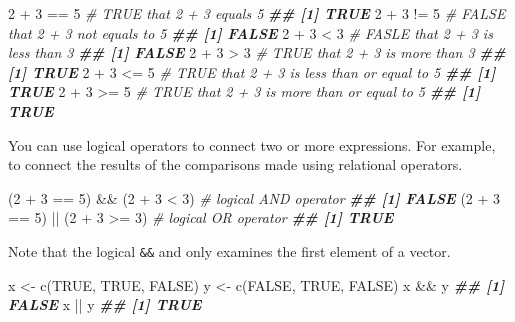 \documentclass[
]{book}
\newenvironment{Shaded}{\begin{snugshade}}{\end{snugshade}}
\newcommand{\CommentTok}[1]{\textcolor[rgb]{0.56,0.35,0.01}{\textit{#1}}}
\newcommand{\ConstantTok}[1]{\textcolor[rgb]{0.00,0.00,0.00}{#1}}
\newcommand{\DecValTok}[1]{\textcolor[rgb]{0.00,0.00,0.81}{#1}}
\newcommand{\DocumentationTok}[1]{\textcolor[rgb]{0.56,0.35,0.01}{\textbf{\textit{#1}}}}
\newcommand{\FunctionTok}[1]{\textcolor[rgb]{0.00,0.00,0.00}{#1}}
\newcommand{\NormalTok}[1]{#1}
\newcommand{\OtherTok}[1]{\textcolor[rgb]{0.56,0.35,0.01}{#1}}
\newcommand{\SpecialCharTok}[1]{\textcolor[rgb]{0.00,0.00,0.00}{#1}}
\begin{document}
\begin{Shaded}
\begin{Highlighting}[]
\DecValTok{2} \SpecialCharTok{+} \DecValTok{3} \SpecialCharTok{==} \DecValTok{5} \CommentTok{\# TRUE that 2 + 3 equals 5}
\DocumentationTok{\#\# [1] TRUE}
\DecValTok{2} \SpecialCharTok{+} \DecValTok{3} \SpecialCharTok{!=} \DecValTok{5} \CommentTok{\# FALSE that 2 + 3 not equals to 5}
\DocumentationTok{\#\# [1] FALSE}
\DecValTok{2} \SpecialCharTok{+} \DecValTok{3} \SpecialCharTok{\textless{}} \DecValTok{3} \CommentTok{\# FASLE that 2 + 3 is less than 3}
\DocumentationTok{\#\# [1] FALSE}
\DecValTok{2} \SpecialCharTok{+} \DecValTok{3} \SpecialCharTok{\textgreater{}} \DecValTok{3} \CommentTok{\# TRUE that 2 + 3 is more than 3}
\DocumentationTok{\#\# [1] TRUE}
\DecValTok{2} \SpecialCharTok{+} \DecValTok{3} \SpecialCharTok{\textless{}=} \DecValTok{5} \CommentTok{\# TRUE that 2 + 3 is less than or equal to 5}
\DocumentationTok{\#\# [1] TRUE}
\DecValTok{2} \SpecialCharTok{+} \DecValTok{3} \SpecialCharTok{\textgreater{}=} \DecValTok{5} \CommentTok{\# TRUE that 2 + 3 is more than or equal to 5}
\DocumentationTok{\#\# [1] TRUE}
\end{Highlighting}
\end{Shaded}

You can use logical operators to connect two or more expressions. For example, to connect the results of the comparisons made using relational operators.

\begin{Shaded}
\begin{Highlighting}[]
\NormalTok{(}\DecValTok{2} \SpecialCharTok{+} \DecValTok{3} \SpecialCharTok{==} \DecValTok{5}\NormalTok{) }\SpecialCharTok{\&\&}\NormalTok{ (}\DecValTok{2} \SpecialCharTok{+} \DecValTok{3} \SpecialCharTok{\textless{}} \DecValTok{3}\NormalTok{) }\CommentTok{\# logical AND operator}
\DocumentationTok{\#\# [1] FALSE}
\NormalTok{(}\DecValTok{2} \SpecialCharTok{+} \DecValTok{3} \SpecialCharTok{==} \DecValTok{5}\NormalTok{) }\SpecialCharTok{||}\NormalTok{ (}\DecValTok{2} \SpecialCharTok{+} \DecValTok{3} \SpecialCharTok{\textgreater{}=} \DecValTok{3}\NormalTok{) }\CommentTok{\# logical OR operator}
\DocumentationTok{\#\# [1] TRUE}
\end{Highlighting}
\end{Shaded}

Note that the logical \texttt{\&\&} and \texttt{\textbar{}\textbar{}} only examines the first element of a vector.

\begin{Shaded}
\begin{Highlighting}[]
\NormalTok{x }\OtherTok{\textless{}{-}} \FunctionTok{c}\NormalTok{(}\ConstantTok{TRUE}\NormalTok{, }\ConstantTok{TRUE}\NormalTok{, }\ConstantTok{FALSE}\NormalTok{)}
\NormalTok{y }\OtherTok{\textless{}{-}} \FunctionTok{c}\NormalTok{(}\ConstantTok{FALSE}\NormalTok{, }\ConstantTok{TRUE}\NormalTok{, }\ConstantTok{FALSE}\NormalTok{)}
\NormalTok{x }\SpecialCharTok{\&\&}\NormalTok{ y}
\DocumentationTok{\#\# [1] FALSE}
\NormalTok{x }\SpecialCharTok{||}\NormalTok{ y}
\DocumentationTok{\#\# [1] TRUE}
\end{Highlighting}
\end{Shaded}
\end{document}
